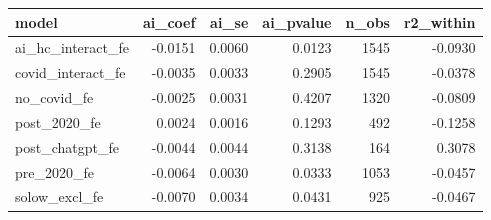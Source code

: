\begin{tabular}{lrrrrr}
\hline
model & ai\_coef & ai\_se & ai\_pvalue & n\_obs & r2\_within \\
\hline
ai\_hc\_interact\_fe & -0.0151 & 0.0060 & 0.0123 & 1545 & -0.0930 \\
covid\_interact\_fe & -0.0035 & 0.0033 & 0.2905 & 1545 & -0.0378 \\
no\_covid\_fe & -0.0025 & 0.0031 & 0.4207 & 1320 & -0.0809 \\
post\_2020\_fe & 0.0024 & 0.0016 & 0.1293 & 492 & -0.1258 \\
post\_chatgpt\_fe & -0.0044 & 0.0044 & 0.3138 & 164 & 0.3078 \\
pre\_2020\_fe & -0.0064 & 0.0030 & 0.0333 & 1053 & -0.0457 \\
solow\_excl\_fe & -0.0070 & 0.0034 & 0.0431 & 925 & -0.0467 \\
\hline
\end{tabular}